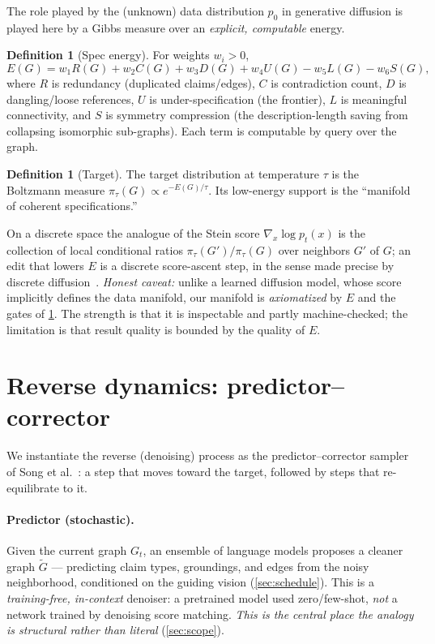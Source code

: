 \documentclass[11pt,letterpaper]{article}
\theoremstyle{plain}
\theoremstyle{definition}
\newtheorem{definition}[theorem]{Definition}
\begin{document}
The role played by the (unknown) data distribution $p_0$ in generative diffusion
is played here by a Gibbs measure over an \emph{explicit, computable} energy.

\begin{definition}[Spec energy]
\label{def:energy}
For weights $w_i>0$,
\[
  E(G)=w_1 R(G)+w_2 C(G)+w_3 D(G)+w_4 U(G)-w_5 L(G)-w_6 S(G),
\]
where $R$ is redundancy (duplicated claims/edges), $C$ is contradiction count,
$D$ is dangling/loose references, $U$ is under-specification (the frontier), $L$ is
meaningful connectivity, and $S$ is symmetry compression (the description-length
saving from collapsing isomorphic sub-graphs). Each term is computable by query
over the graph.
\end{definition}

\begin{definition}[Target]
The target distribution at temperature $\tau$ is the Boltzmann measure
$\pi_\tau(G)\propto e^{-E(G)/\tau}$. Its low-energy support is the ``manifold of
coherent specifications.''
\end{definition}

On a discrete space the analogue of the Stein score $\nabla_x\log p_t(x)$ is the
collection of local conditional ratios $\pi_\tau(G')/\pi_\tau(G)$ over neighbors
$G'$ of $G$; an edit that lowers $E$ is a discrete score-ascent step, in the sense
made precise by discrete diffusion~\cite{austin2021d3pm}. \emph{Honest caveat:}
unlike a learned diffusion model, whose score implicitly defines the data manifold,
our manifold is \emph{axiomatized} by $E$ and the gates of \cref{sec:reverse}. The
strength is that it is inspectable and partly machine-checked; the limitation is
that result quality is bounded by the quality of $E$.

\section{Reverse dynamics: predictor--corrector}
\label{sec:reverse}

We instantiate the reverse (denoising) process as the predictor--corrector sampler
of Song et al.~\cite{song2021sde}: a step that moves toward the target, followed by
steps that re-equilibrate to it.



\paragraph{Predictor (stochastic).} Given the current graph $G_t$, an ensemble of
language models proposes a cleaner graph $\tilde G$ --- predicting claim types,
groundings, and edges from the noisy neighborhood, conditioned on the guiding
vision (\cref{sec:schedule}). This is a \emph{training-free, in-context} denoiser:
a pretrained model used zero/few-shot, \emph{not} a network trained by denoising
score matching. \emph{This is the central place the analogy is structural rather
than literal} (\cref{sec:scope}).
\end{document}
